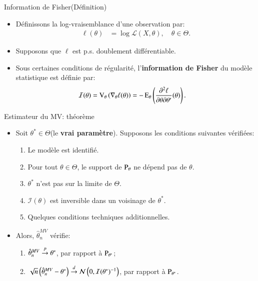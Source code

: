 \begin{frame}
    [allowframebreaks]{Information de Fisher(Définition)}
    \begin{itemize}
        \item Définissons la log-vraisemblance d'une observation par: \begin{align*}
            \ell(\theta)&= \log \mathcal{L}(X, \theta), \quad \theta \in \Theta.
        \end{align*}
        \item Supposons que $\ell$ est p.s. doublement différentiable. 
        \item Sous certaines conditions de régularité, l'\textbf{information de Fisher} 
        du modèle statistique est définie par: \begin{align*}
            \mathcal{I}(\theta)&=\operatorname{V}_\theta\left(\nabla_\theta\ell(\theta)\right)
            =-\operatorname{E}_\theta\left(\frac{\partial^2\ell}{\partial\theta\partial\theta'}(\theta)\right).
        \end{align*}
    \end{itemize}
\end{frame}

\begin{frame}
    [allowframebreaks]{Estimateur du MV: théorème}
    \begin{itemize}
        \item Soit $\theta^* \in \Theta$(le \textbf{vrai paramètre}). Supposons les conditions suivantes vérifiées: 
        \begin{enumerate}
            \item Le modèle est identifié.
            \item Pour tout $\theta \in \Theta$, le support de $\operatorname{P}_\theta$ ne dépend pas de $\theta$.
            \item $\theta^*$ n'est pas sur la limite de $\Theta$.
            \item $\mathcal{I}(\theta)$ est inversible dans un voisinage de $\theta^*$.
            \item Quelques conditions techniques additionnelles.
        \end{enumerate}
        \item  Alors, $\hat{\theta}_n^{MV}$ vérifie: \begin{enumerate}[-]
            \item $\hat{\theta}_n^{MV} \overset{p}{\rightarrow} \theta^*$, par rapport à $\operatorname{P}_{\theta^*}$;
            \item $\sqrt{n}\left(\hat{\theta}_n^{MV} - \theta^*\right) 
            \overset{d}{\rightarrow} \mathcal{N}\left(0, \mathcal{I}(\theta^*)^{-1}\right)$, par rapport à $\operatorname{P}_{\theta^*}$.
        \end{enumerate}
    \end{itemize}
\end{frame}

